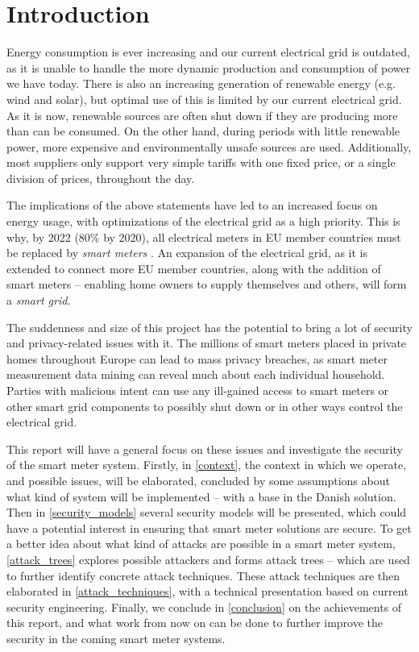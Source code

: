 
\chapter*{Introduction}

Energy consumption is ever increasing and our current electrical grid is outdated, as it is unable to handle the more dynamic production and consumption of power we have today.
There is also an increasing generation of renewable energy (e.g. wind and solar), but optimal use of this is limited by our current electrical grid.
As it is now, renewable sources are often shut down if they are producing more than can be consumed.
On the other hand, during periods with little renewable power, more expensive and environmentally unsafe sources are used.
Additionally, most suppliers only support very simple tariffs with one fixed price, or a single division of prices, throughout the day.

The implications of the above statements have led to an increased focus on energy usage, with optimizations of the electrical grid as a high priority.
This is why, by 2022 (80\% by 2020), all  electrical meters in EU member countries must be replaced by \emph{smart meters} \cite{smart_meter_survey, directive_2009_72_EC}.
An expansion of the electrical grid, as it is extended to connect more EU member countries, along with the addition of smart meters -- enabling home owners to supply themselves and others, will form a \emph{smart grid}.

The suddenness and size of this project has the potential to bring a lot of security and privacy-related issues with it.
The millions of smart meters placed in private homes throughout Europe can lead to mass privacy breaches, as smart meter measurement data mining can reveal much about each individual household.
Parties with malicious intent can use any ill-gained access to smart meters or other smart grid components to possibly shut down or in other ways control the electrical grid.

This report will have a general focus on these issues and investigate the security of the smart meter system.
Firstly, in \cref{context}, the context in which we operate, and possible issues, will be elaborated, concluded by some assumptions about what kind of system will be implemented -- with a base in the Danish solution.
Then in \cref{security_models} several security models will be presented, which could have a potential interest in ensuring that smart meter solutions are secure.
To get a better idea about what kind of attacks are possible in a smart meter system, \cref{attack_trees} explores possible attackers and forms attack trees -- which are used to further identify concrete attack techniques.
These attack techniques are then elaborated in \cref{attack_techniques}, with a technical presentation based on current security engineering.
Finally, we conclude in \cref{conclusion} on the achievements of this report, and what work from now on can be done to further improve the security in the coming smart meter systems.
